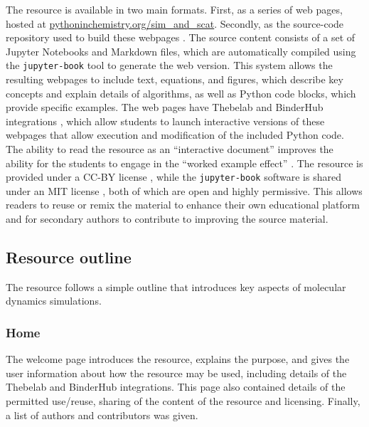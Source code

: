 The resource is available in two main formats.
First, as a series of web pages, hosted at \href{https://pythoninchemistry.org/sim_and_scat}{pythoninchemistry.org/sim\_and\_scat}.
Secondly, as the source-code repository used to build these webpages \cite{mccluskey_pythoninchemistry/sim_and_scat_2019}.
The source content consists of a set of Jupyter Notebooks and Markdown files, which are automatically compiled using the \texttt{jupyter-book} tool \cite{lau_jupyter/jupyter-book_2019} to generate the web version.
This system allows the resulting webpages to include text, equations, and figures, which describe key concepts and explain details of algorithms, as well as Python code blocks, which provide specific examples.
The web pages have Thebelab and BinderHub integrations \cite{ragan-kelley_minrk/thebelab_2019, ragan-kelley_jupyterhub/binderhub_2019, jupyter_binder_2018}, which allow students to launch interactive versions of these webpages that allow execution and modification of the included Python code.
The ability to read the resource as an ``interactive document'' improves the ability for the students to engage in the ``worked example effect'' \cite{tarmizi_guidance_1988}.
The resource is provided under a CC-BY license \cite{creative_commons_creative_2019}, while the \texttt{jupyter-book} software is shared under an MIT license \cite{open_source_mit_2019}, both of which are open and highly permissive.
This allows readers to reuse or remix the material to enhance their own educational platform and for secondary authors to contribute to improving the source material.

\subsection{Resource outline}

The resource follows a simple outline that introduces key aspects of molecular dynamics simulations.

\subsubsection{Home}

The welcome page introduces the resource, explains the purpose, and gives the user information about how the resource may be used, including details of the Thebelab and BinderHub integrations.
This page also contained details of the permitted use/reuse, sharing of the content of the resource and licensing.
Finally, a list of authors and contributors was given.

